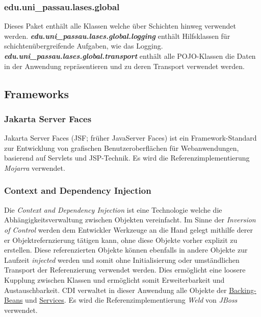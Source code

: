 \subsubsection{edu.uni\_passau.lases.global}
Dieses Paket enthält alle Klassen welche über Schichten hinweg
verwendet werden.
\newline\newline
\textbf{\emph{edu.uni\_passau.lases.global.logging}}
enthält Hilfsklassen für schichtenübergreifende Aufgaben, wie das Logging.
\newline\newline
\textbf{\emph{edu.uni\_passau.lases.global.transport}}
enthält alle POJO-Klassen die Daten in der Anwendung repräsentieren und zu deren
Transport verwendet werden.


\subsection{Frameworks}\label{arch:frameworks}
\subsubsection{Jakarta Server Faces}
Jakarta Server Faces (JSF; früher JavaServer Faces) ist ein Framework-Standard zur
Entwicklung von grafischen Benutzeroberflächen für Webanwendungen, basierend auf Servlets und JSP-Technik.
Es wird die Referenzimplementierung \emph{Mojarra} verwendet.

\subsubsection{Context and Dependency Injection}
Die \emph{Context and Dependency Injection} ist eine Technologie welche die
Abhängigkeitsverwaltung zwischen Objekten vereinfacht. Im Sinne der
\emph{Inversion of Control} werden dem Entwickler Werkzeuge an die Hand gelegt mithilfe derer
er Objektrefernzierung tätigen kann, ohne diese Objekte vorher explizit zu erstellen.
Diese referenzierten Objekte können ebenfalls in andere Objekte zur Laufzeit \emph{injected}
werden und somit ohne Initialisierung oder umständlichen Transport der Referenzierung
verwendet werden.
Dies ermöglicht eine loosere Kupplung zwischen Klassen und ermöglicht somit Erweiterbarkeit
und Austauschbarkeit.
CDI verwaltet in dieser Anwendung alle Objekte der \hyperref[arch:backing]{Backing-Beans}
und \hyperref[arch:service]{Services}.
Es wird die Referenzimplementierung \emph{Weld} von \emph{JBoss} verwendet.

